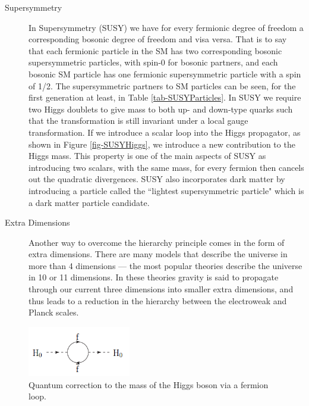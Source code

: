 \begin{description}
	\item[Supersymmetry] In Supersymmetry (SUSY) we have for every fermionic degree of freedom a corresponding bosonic degree of freedom and visa versa. That is to say that each fermionic particle in the SM has two corresponding bosonic supersymmetric particles, with spin-0 for bosonic partners, and each bosonic SM particle has one fermionic supersymmetric particle with a spin of 1/2. The supersymmetric partners to SM particles can be seen, for the first generation at least, in Table \ref{tab-SUSYParticles}. In SUSY we require two Higgs doublets to give mass to both up- and down-type quarks such that the transformation is still invariant under a local gauge transformation. If we introduce a scalar loop into the Higgs propagator, as shown in Figure \ref{fig-SUSYHiggs}, we introduce a new contribution to the Higgs mass. This property is one of the main aspects of SUSY as introducing two scalars, with the same mass, for every fermion then cancels out the quadratic divergences. SUSY also incorporates dark matter by introducing a particle called the ``lightest supersymmetric particle" which is a dark matter particle candidate. 
	\item[Extra Dimensions] Another way to overcome the hierarchy principle comes in the form of extra dimensions. There are many models that describe the universe in more than 4 dimensions --- the most popular theories describe the universe in 10 or 11 dimensions. In these theories gravity is said to propagate through our current three dimensions into smaller extra dimensions, and thus leads to a reduction in the hierarchy between the electroweak and Planck scales.
\end{description}

\begin{figure}
\begin{center}
\includegraphics[width=0.4\textwidth]{Figures/HiggsCorrection.png}
\end{center}
\caption{Quantum correction to the mass of the Higgs boson via a fermion loop.}
\label{fig-HiggsCorrections}
\end{figure}

